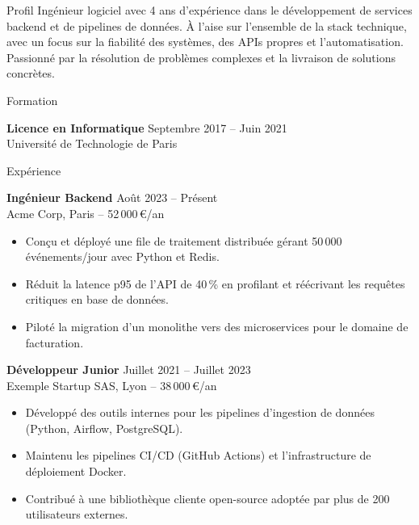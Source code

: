 \documentclass{resume} %
\begin{document}
\begin{rSection}{Profil}
Ingénieur logiciel avec 4 ans d'expérience dans le développement de services backend et de pipelines de données.
À l'aise sur l'ensemble de la stack technique, avec un focus sur la fiabilité des systèmes, des APIs propres
et l'automatisation. Passionné par la résolution de problèmes complexes et la livraison de solutions concrètes.
\end{rSection}

\begin{rSection}{Formation}

{\bf Licence en Informatique} \hfill {Septembre 2017 -- Juin 2021}\\
Université de Technologie de Paris

\medskip
\end{rSection}

\begin{rSection}{Expérience}

\textbf{Ingénieur Backend} \hfill {Août 2023 -- Présent}\\
Acme Corp, Paris -- 52\,000\,€/an\\
\smallskip
\begin{itemize}[leftmargin=1em, itemsep=-2pt, topsep=4pt]
  \item Conçu et déployé une file de traitement distribuée gérant 50\,000 événements/jour avec Python et Redis.
  \item Réduit la latence p95 de l'API de 40\,\% en profilant et réécrivant les requêtes critiques en base de données.
  \item Piloté la migration d'un monolithe vers des microservices pour le domaine de facturation.
\end{itemize}

\medskip

\textbf{Développeur Junior} \hfill {Juillet 2021 -- Juillet 2023}\\
Exemple Startup SAS, Lyon -- 38\,000\,€/an\\
\smallskip
\begin{itemize}[leftmargin=1em, itemsep=-2pt, topsep=4pt]
  \item Développé des outils internes pour les pipelines d'ingestion de données (Python, Airflow, PostgreSQL).
  \item Maintenu les pipelines CI/CD (GitHub Actions) et l'infrastructure de déploiement Docker.
  \item Contribué à une bibliothèque cliente open-source adoptée par plus de 200 utilisateurs externes.
\end{itemize}

\end{rSection}
\end{document}
